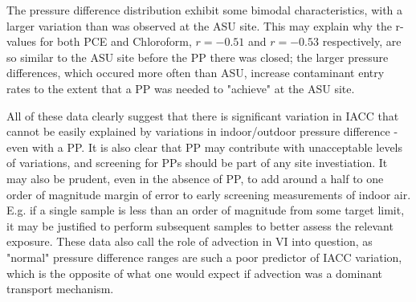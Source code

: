 \documentclass[journal=esthag,manuscript=article]{achemso}
\begin{document}
The pressure difference distribution exhibit some bimodal characteristics, with a larger variation than was observed at the ASU site.
This may explain why the r-values for both PCE and Chloroform, $r=-0.51$ and $r=-0.53$ respectively, are so similar to the ASU site before the PP there was closed; the larger pressure differences, which occured more often than ASU, increase contaminant entry rates to the extent that a PP was needed to "achieve" at the ASU site.\par
All of these data clearly suggest that there is significant variation in IACC that cannot be easily explained by variations in indoor/outdoor pressure difference - even with a PP.
It is also clear that PP may contribute with unacceptable levels of variations, and screening for PPs should be part of any site investiation.
It may also be prudent, even in the absence of PP, to add around a half to one order of magnitude margin of error to early screening measurements of indoor air.
E.g. if a single sample is less than an order of magnitude from some target limit, it may be justified to perform subsequent samples to better assess the relevant exposure.
These data also call the role of advection in VI into question, as "normal" pressure difference ranges are such a poor predictor of IACC variation, which is the opposite of what one would expect if advection was a dominant transport mechanism.\par
\end{document}

